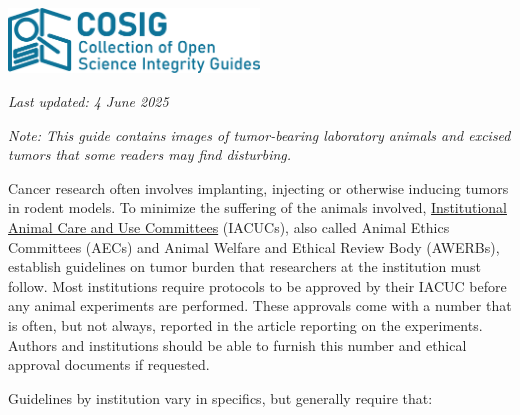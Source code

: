 \documentclass[letterpaper, 12pt]{article}
\begin{document}
\flushleft\includegraphics[width=0.5\textwidth]{img/home/241017_final_logo_mockup.png}

\textit{Last updated: 4 June 2025}

\textit{Note: This guide contains images of tumor-bearing laboratory animals and excised tumors that some readers may find disturbing.}

Cancer research often involves implanting, injecting or otherwise inducing tumors in rodent models. To minimize the suffering of the animals involved, \href{https://en.wikipedia.org/wiki/Institutional_Animal_Care_and_Use_Committee}{Institutional Animal Care and Use Committees} (IACUCs), also called Animal Ethics Committees (AECs) and Animal Welfare and Ethical Review Body (AWERBs), establish guidelines on tumor burden that researchers at the institution must follow. Most institutions require protocols to be approved by their IACUC before any animal experiments are performed. These approvals come with a number that is often, but not always, reported in the article reporting on the experiments. Authors and institutions should be able to furnish this number and ethical approval documents if requested.

Guidelines by institution vary in specifics, but generally require that:
\end{document}

